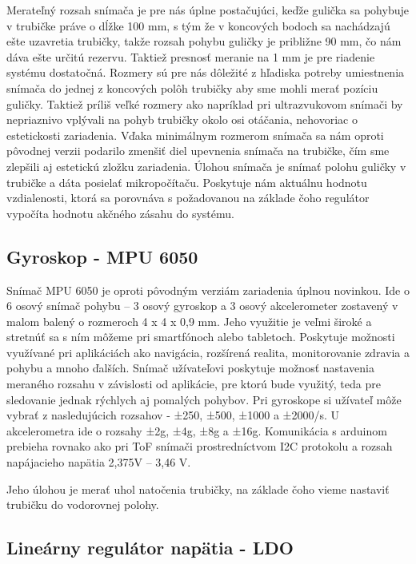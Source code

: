 Merateľný rozsah snímača je pre nás úplne postačujúci, keďže gulička sa pohybuje v trubičke práve o dĺžke 100 mm, s tým že v koncových bodoch sa nachádzajú ešte uzavretia trubičky, takže rozsah pohybu guličky je približne 90 mm, čo nám dáva ešte určitú rezervu. Taktiež presnosť meranie na 1 mm je pre riadenie systému dostatočná. Rozmery sú pre nás dôležité z hľadiska potreby umiestnenia snímača do jednej z koncových polôh trubičky aby sme mohli merať pozíciu guličky. Taktiež príliš veľké rozmery ako napríklad pri ultrazvukovom snímači by nepriaznivo vplývali na pohyb trubičky okolo osi otáčania, nehovoriac o estetickosti zariadenia. Vďaka minimálnym rozmerom snímača sa nám oproti pôvodnej verzii podarilo zmenšiť diel upevnenia snímača na trubičke, čím sme zlepšili aj estetickú zložku zariadenia.
Úlohou snímača je snímať polohu guličky v trubičke a dáta posielať mikropočítaču. Poskytuje nám aktuálnu hodnotu vzdialenosti, ktorá sa porovnáva s požadovanou na základe čoho regulátor vypočíta hodnotu akčného zásahu do systému.


\subsection{Gyroskop - MPU 6050}
\label{kap:2.2.3}

Snímač MPU 6050 je oproti pôvodným verziám zariadenia úplnou novinkou. Ide o 6 osový snímač pohybu – 3 osový gyroskop a 3 osový akcelerometer zostavený v malom balený o rozmeroch 4 x 4 x 0,9 mm. Jeho využitie je veľmi široké a stretnúť sa s ním môžeme pri smartfónoch alebo tabletoch. Poskytuje možnosti využívané pri aplikáciách ako navigácia, rozšírená realita, monitorovanie zdravia a pohybu a mnoho ďalších. Snímač užívateľovi poskytuje možnosť nastavenia meraného rozsahu v závislosti od aplikácie, pre ktorú bude využitý, teda pre sledovanie jednak rýchlych aj pomalých pohybov. Pri gyroskope si užívateľ môže vybrať z nasledujúcich rozsahov - ±250, ±500, ±1000 a ±2000\textdegree /s. U akcelerometra ide o rozsahy ±2g, ±4g, ±8g a ±16g.  Komunikácia s arduinom prebieha rovnako ako pri ToF snímači prostredníctvom I2C protokolu a rozsah napájacieho napätia 2,375V – 3,46 V.  

Jeho úlohou je merať uhol natočenia trubičky, na základe čoho vieme nastaviť trubičku do vodorovnej polohy.  



\subsection{Lineárny regulátor napätia - LDO}
\label{kap:2.2.4}

